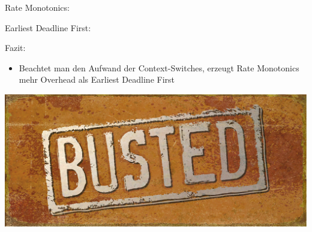 \begin{frame}{\subsecname}
	Rate Monotonics:
	
	Earliest Deadline First:
	
\end{frame}

\begin{frame}{\subsecname}
	Fazit:
	\begin{itemize}
		\item Beachtet man den Aufwand der Context-Switches, erzeugt Rate Monotonics mehr Overhead als Earliest Deadline First
	\end{itemize}
\end{frame}

\begin{frame}{\subsecname}
	\begin{center}
			\includegraphics[scale=1]{graphics/memes/busted.jpg}
	\end{center}
\end{frame}
